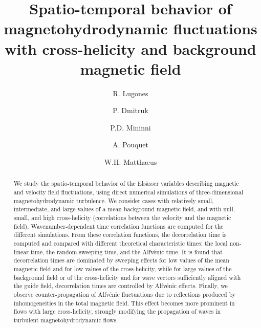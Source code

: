 \documentclass[aip,pop,reprint,amsmath,amssymb,floatfix]{revtex4-1}
\begin{document}
\title{Spatio-temporal behavior of magnetohydrodynamic fluctuations with cross-helicity and background magnetic field}

\author{R. Lugones}
  
\author{P. Dmitruk}
  
\author{P.D. Mininni}

\author{A. Pouquet}
\author{W.H. Matthaeus}


\begin{abstract}
  We study the spatio-temporal behavior of the Els\"asser variables
  describing magnetic and velocity field fluctuations, using direct
  numerical simulations of three-dimensional magnetohydrodynamic
  turbulence. We consider cases with relatively small, intermediate,
  and large values of a mean background magnetic field, and with null,
  small, and high cross-helicity (correlations between the velocity
  and the magnetic field). Wavenumber-dependent time correlation
  functions are computed for the different simulations. From these
  correlation functions, the decorrelation time is computed and
  compared with different theoretical characteristic times: the local
  non-linear time, the random-sweeping time, and the Alfv\'enic
  time. It is found that decorrelation times are dominated by sweeping
  effects for low values of the mean magnetic field and for low values
  of the cross-helicity, while for large values of the background
  field or of the cross-helicity and for wave vectors sufficiently
  aligned with the guide field, decorrelation times are controlled by
  Alfv\'enic effects. Finally, we observe counter-propagation of
  Alfv\'enic fluctuations due to reflections produced by
  inhomogeneities in the total magnetic field. This effect becomes
  more prominent in flows with large cross-helicity, strongly
  modifying the propagation of waves in turbulent magnetohydrodynamic
  flows.
\end{abstract}
\end{document}
